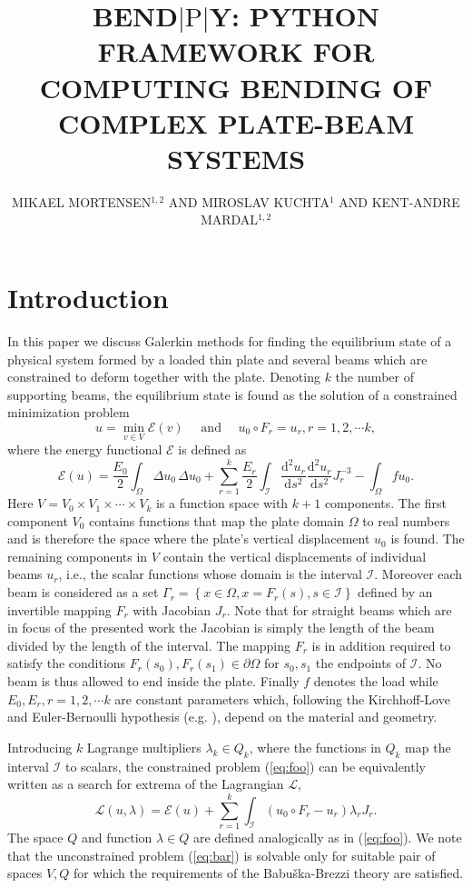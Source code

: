 \documentclass{marine_2015}
\title{
  BEND$\left|\text{P}\right|$Y: PYTHON FRAMEWORK FOR COMPUTING BENDING OF COMPLEX PLATE-BEAM SYSTEMS
}
\author{MIKAEL MORTENSEN$^{1, 2}$ AND MIROSLAV KUCHTA$^{1}$ AND KENT-ANDRE MARDAL$^{1, 2}$ }
\newcommand{\deriv}[2]{\ensuremath{\frac{\mathrm{d}#1}{\mathrm{d}#2}}}
\begin{document}
\section{Introduction}
In this paper we discuss Galerkin methods for finding the equilibrium state of a 
physical system formed by a loaded thin plate and several beams which are constrained 
to deform together with the plate. Denoting $k$ the number of supporting beams, 
the equilibrium state is found as the solution of a constrained minimization problem
\begin{equation}
  \label{eq:foo}
  u = \min_{v\in V} \mathcal{E}\left(v\right)\quad\text{ and }\quad u_0\circ F_r
  = u_r, r=1, 2, \cdots k,
\end{equation}
where the energy functional $\mathcal{E}$ is defined as
\[
  \mathcal{E}\left(u\right)=
    \frac{E_0}{2}\displaystyle\int_{\Omega}\Delta u_0\,\Delta u_0+
    \sum_{r=1}^k\frac{E_r}{2}\int_{\mathcal{I}}
  \deriv{^2u_r}{s^2}\deriv{^2u_r}{s^2}J_r^{-3}
  -\displaystyle\int_{\Omega}f u_0.
\]
Here $V=V_0\times V_1 \times\cdots\times V_k$ is a function space with $k+1$
components. The first component $V_0$ contains functions that map the plate
domain $\Omega$ to real numbers and is therefore the space where the plate's
vertical displacement $u_0$ is found. The remaining components in $V$ contain the 
vertical displacements of individual beams $u_r$, i.e., the scalar 
functions whose domain is the interval $\mathcal{I}$. Moreover each beam is
considered as a set $\Gamma_r=\left\{x\in\Omega, x=F_r\left(s\right), s\in\mathcal{I}\right\}$
defined by an invertible mapping $F_r$ with Jacobian $J_r$. Note that for straight 
beams which are in focus of the presented work the Jacobian is simply the length of
the beam divided by the length of the interval. The mapping $F_r$ is in addition 
required to satisfy the conditions $F_r\left(s_0\right), F_r\left(s_1\right)\in\partial\Omega$ 
for $s_0, s_1$ the endpoints of $\mathcal{I}$. No beam is thus allowed to end inside 
the plate. Finally $f$ denotes the load while $E_0, E_r, r=1,2,\cdots k$ are 
constant parameters which, following the Kirchhoff-Love and Euler-Bernoulli
hypothesis (e.g. \cite{reddy}), depend on the material and geometry.

Introducing $k$ Lagrange multipliers $\lambda_k\in Q_k$, where the functions in 
$Q_k$ map the interval $\mathcal{I}$ to scalars, the constrained problem 
(\ref{eq:foo}) can be equivalently written as a search for extrema of the Lagrangian
$\mathcal{L}$,
\begin{equation}
  \label{eq:bar}
\mathcal{L}\left(u, \lambda\right) = \mathcal{E}\left(u\right) +
  \sum_{r=1}^k\int_{\mathcal{I}}\left(u_0\circ F_r - u_r\right)\lambda_r J_r.
\end{equation}
The space $Q$ and function $\lambda\in Q$ are defined analogically as in (\ref{eq:foo}).
We note that the unconstrained problem (\ref{eq:bar}) is solvable only for
suitable pair of spaces $V, Q$ for which the requirements of the
Babu\v{s}ka-Brezzi\cite{babuska, brezzi} theory are satisfied.
\end{document}
